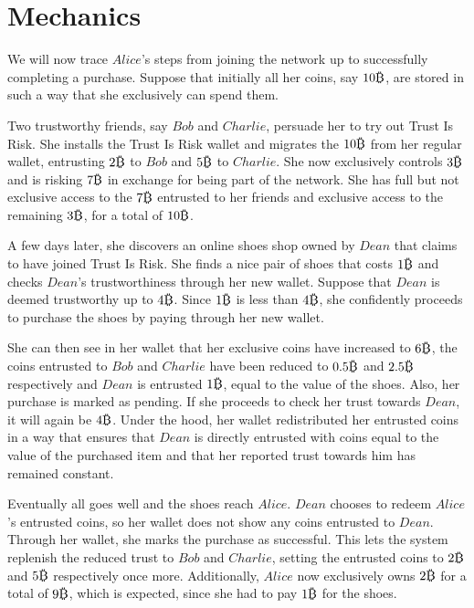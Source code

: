 \section{Mechanics}
  We will now trace $Alice$'s steps from joining the network up to successfully completing a purchase. Suppose that initially
  all her coins, say $10\bitcoin$, are stored in such a way that she exclusively can spend them.

  Two trustworthy friends, say $Bob$ and $Charlie$, persuade her to try out Trust Is Risk. She installs the Trust Is Risk
  wallet and migrates the $10\bitcoin$ from her regular wallet, entrusting $2\bitcoin$ to $Bob$ and $5\bitcoin$ to $Charlie$.
  She now exclusively controls $3\bitcoin$ and is risking $7\bitcoin$ in exchange for being part of the network. She has full
  but not exclusive access to the $7\bitcoin$ entrusted to her friends and exclusive access to the remaining $3\bitcoin$, for
  a total of $10\bitcoin$.

  A few days later, she discovers an online shoes shop owned by $Dean$ that claims to have joined Trust Is Risk. She finds a
  nice pair of shoes that costs $1\bitcoin$ and checks $Dean$'s trustworthiness through her new wallet. Suppose that $Dean$
  is deemed trustworthy up to $4\bitcoin$. Since $1\bitcoin$ is less than $4\bitcoin$, she confidently proceeds to purchase
  the shoes by paying through her new wallet.

  She can then see in her wallet that her exclusive coins have increased to $6\bitcoin$, the coins entrusted to $Bob$ and
  $Charlie$ have been reduced to $0.5\bitcoin$ and $2.5\bitcoin$ respectively and $Dean$ is entrusted $1\bitcoin$, equal to
  the value of the shoes. Also, her purchase is marked as pending. If she proceeds to check her trust towards $Dean$, it will
  again be $4\bitcoin$. Under the hood, her wallet redistributed her entrusted coins in a way that ensures that $Dean$ is
  directly entrusted with coins equal to the value of the purchased item and that her reported trust towards him has remained
  constant.

  Eventually all goes well and the shoes reach $Alice$. $Dean$ chooses to redeem $Alice$'s entrusted coins, so her wallet
  does not show any coins entrusted to $Dean$. Through her wallet, she marks the purchase as successful. This lets the system
  replenish the reduced trust to $Bob$ and $Charlie$, setting the entrusted coins to $2\bitcoin$ and $5\bitcoin$ respectively
  once more. Additionally, $Alice$ now exclusively owns $2\bitcoin$ for a total of $9\bitcoin$, which is expected, since she
  had to pay $1\bitcoin$ for the shoes.
